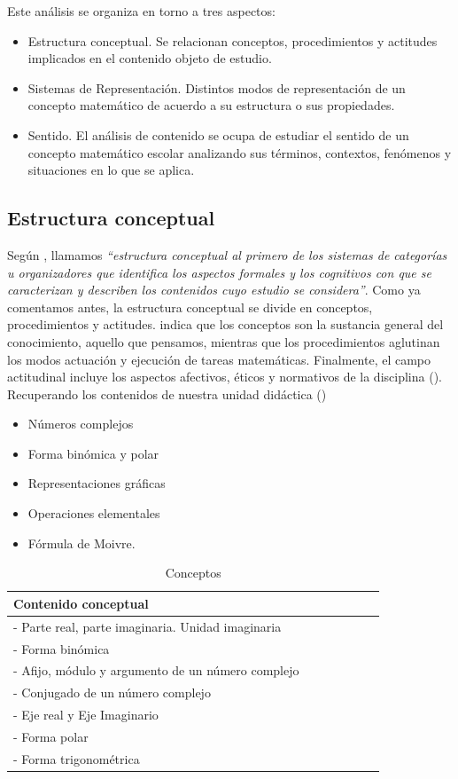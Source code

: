\documentclass[../main.tex]{memoir}
\begin{document}
Este análisis se organiza en torno a tres aspectos:

\begin{itemize}
	\item Estructura conceptual. Se relacionan conceptos, procedimientos y actitudes implicados en el contenido objeto de estudio.
	\item Sistemas de Representación. Distintos modos de representación de un concepto matemático de acuerdo a su estructura o sus propiedades.
	\item Sentido. El análisis de contenido se ocupa de estudiar el sentido de un concepto matemático escolar analizando sus términos, contextos, fenómenos y situaciones en lo que se aplica.
\end{itemize}


\subsection{Estructura conceptual}

Según \cite{rico2016}, llamamos \textit{``estructura conceptual al primero de los sistemas de categorías u organizadores que identifica los aspectos formales y los cognitivos con que se caracterizan y describen los contenidos cuyo estudio se considera''}. Como ya comentamos antes, la estructura conceptual se divide en conceptos, procedimientos y actitudes. \cite{rico1997} indica que los conceptos son la sustancia general del conocimiento, aquello que pensamos, mientras que los procedimientos aglutinan los modos actuación y ejecución de tareas matemáticas. Finalmente, el campo actitudinal incluye los aspectos afectivos, éticos y normativos de la disciplina (\cite{rico2016}). Recuperando los contenidos de nuestra unidad didáctica (\cite{RD1105})

\begin{itemize}
	\item Números complejos
	\item Forma binómica y polar
	\item Representaciones gráficas
	\item Operaciones elementales
	\item Fórmula de Moivre.
\end{itemize}

\begin{table}[H]
	\centering
	\begin{tabular}{lcccccc}
		\toprule
		\hspace{2.5cm}Contenido conceptual \\
		\midrule
		- Parte real, parte imaginaria. Unidad imaginaria \\
		- Forma binómica \\
		- Afijo, módulo y argumento de un número complejo \\
		- Conjugado de un número complejo \\
		- Eje real y Eje Imaginario \\
		- Forma polar \\
		- Forma trigonométrica\\
		\bottomrule
	\end{tabular}
	\caption{Conceptos}
	\label{tab:conceptos}
\end{table}
\end{document}
